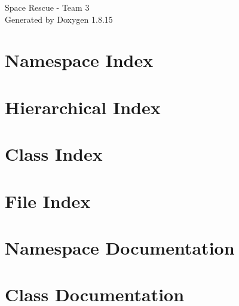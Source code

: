 \let\mypdfximage\pdfximage\def\pdfximage{\immediate\mypdfximage}\documentclass[twoside]{book}
\newcommand{\+}{\discretionary{\mbox{\scriptsize$\hookleftarrow$}}{}{}}
\newcommand{\clearemptydoublepage}{%
  \newpage{\pagestyle{empty}\cleardoublepage}%
}
\begin{document}
\hypersetup{pageanchor=false,
             bookmarksnumbered=true,
             pdfencoding=unicode
            }
\begin{titlepage}
\vspace*{7cm}
\begin{center}%
{\Large Space Rescue -\/ Team 3 }\\
\vspace*{1cm}
{\large Generated by Doxygen 1.8.15}\\
\end{center}
\end{titlepage}
\clearemptydoublepage
{}
\tableofcontents
\clearemptydoublepage
{}
\hypersetup{pageanchor=true}

\chapter{Namespace Index}

\chapter{Hierarchical Index}

\chapter{Class Index}

\chapter{File Index}

\chapter{Namespace Documentation}

\chapter{Class Documentation}































\end{document}
